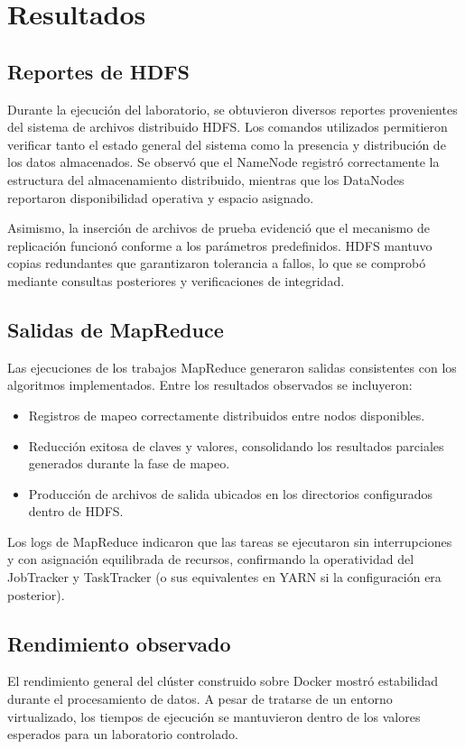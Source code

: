 \section{Resultados}

\subsection{Reportes de HDFS}
Durante la ejecuci\'on del laboratorio, se obtuvieron diversos reportes provenientes del sistema de archivos distribuido HDFS. Los comandos utilizados permitieron verificar tanto el estado general del sistema como la presencia y distribuci\'on de los datos almacenados. Se observ\'o que el NameNode registr\'o correctamente la estructura del almacenamiento distribuido, mientras que los DataNodes reportaron disponibilidad operativa y espacio asignado.

Asimismo, la inserci\'on de archivos de prueba evidenci\'o que el mecanismo de replicaci\'on funcion\'o conforme a los par\'ametros predefinidos. HDFS mantuvo copias redundantes que garantizaron tolerancia a fallos, lo que se comprob\'o mediante consultas posteriores y verificaciones de integridad.

\subsection{Salidas de MapReduce}
Las ejecuciones de los trabajos MapReduce generaron salidas consistentes con los algoritmos implementados. Entre los resultados observados se incluyeron:

\begin{itemize}
    \item Registros de mapeo correctamente distribuidos entre nodos disponibles.
    \item Reducci\'on exitosa de claves y valores, consolidando los resultados parciales generados durante la fase de mapeo.
    \item Producci\'on de archivos de salida ubicados en los directorios configurados dentro de HDFS.
\end{itemize}

Los logs de MapReduce indicaron que las tareas se ejecutaron sin interrupciones y con asignaci\'on equilibrada de recursos, confirmando la operatividad del JobTracker y TaskTracker (o sus equivalentes en YARN si la configuraci\'on era posterior).

\subsection{Rendimiento observado}
El rendimiento general del cl\'uster construido sobre Docker mostr\'o estabilidad durante el procesamiento de datos. A pesar de tratarse de un entorno virtualizado, los tiempos de ejecuci\'on se mantuvieron dentro de los valores esperados para un laboratorio controlado.

